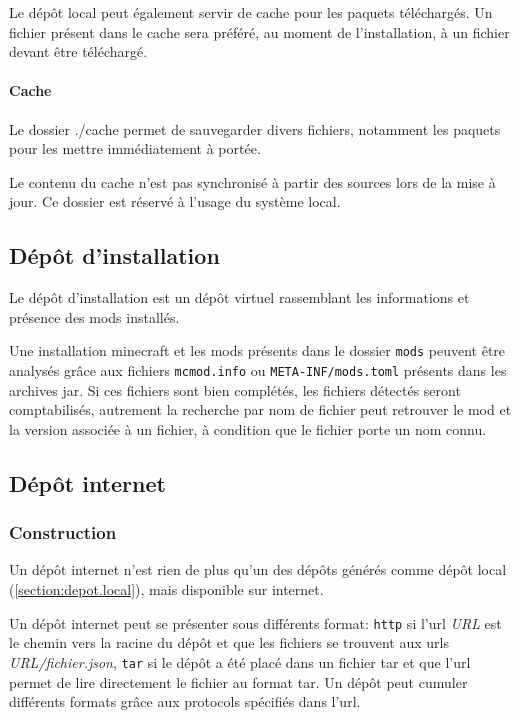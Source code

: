 \documentclass{article}
\begin{document}
Le dépôt local peut également servir de cache pour les paquets téléchargés.
Un fichier présent dans le cache sera préféré, au moment de l'installation, à un fichier devant être téléchargé.

\paragraph{Cache}
Le dossier \textsf{./cache} permet de sauvegarder divers fichiers, notamment les paquets pour les mettre immédiatement à portée.

Le contenu du cache n'est pas synchronisé à partir des sources lors de la mise à jour.
Ce dossier est réservé à l'usage du système local.

\subsection{Dépôt d'installation}
\label{section:depot.installation}
Le dépôt d'installation est un dépôt virtuel rassemblant les informations et présence des mods installés.

Une installation minecraft et les mods présents dans le dossier \texttt{mods} peuvent être analysés grâce aux fichiers \texttt{mcmod.info} ou \texttt{META-INF/mods.toml} présents dans les archives jar.
Si ces fichiers sont bien complétés, les fichiers détectés seront comptabilisés, autrement la recherche par nom de fichier peut retrouver le mod et la version associée à un fichier, à condition que le fichier porte un nom connu.

\subsection{Dépôt internet}
\label{section:depot.internet}
\subsubsection{Construction}
Un dépôt internet n'est rien de plus qu'un des dépôts générés comme dépôt local (\ref{section:depot.local}), mais disponible sur internet.

Un dépôt internet peut se présenter sous différents format: \texttt{http} si l'url \textit{URL} est le chemin vers la racine du dépôt et que les fichiers se trouvent aux urls \textit{URL/fichier.json}, \texttt{tar} si le dépôt a été placé dans un fichier tar et que l'url permet de lire directement le fichier au format tar.
Un dépôt peut cumuler différents formats grâce aux protocols spécifiés dans l'url.
\end{document}
